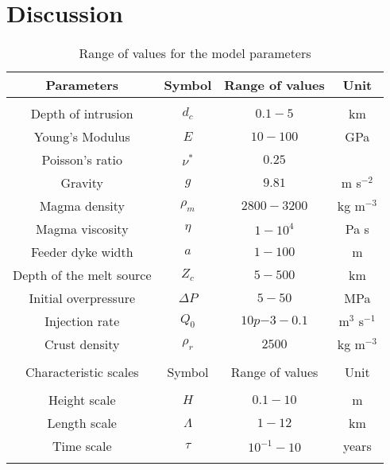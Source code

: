 \section{Discussion}
\label{C2-sec:discussion}


\begin{table}
  \caption{Range of values for the model parameters}
  \centering
  \begin{tabular}{c|c|c|c}
    \hline
    Parameters& Symbol & Range of values &Unit\\
    \hline
              &&\\
    Depth of intrusion & $d_c$ & $0.1-5$ &km \\
    Young's Modulus & $E$ & $10-100$ &GPa \\
    Poisson's ratio & $\nu^*$ & $0.25$ &\\
    Gravity & $g$ & $9.81$ &m s$^{-2}$ \\
    Magma density & $\rho_{m}$ & $2800-3200$ &kg m$^{-3}$ \\
    Magma viscosity & $\eta $ & $1-10^{4}$ &Pa s \\
    Feeder dyke width & $a$ & $1-100$ &m \\
    Depth of the melt source & $Z_{c}$ & $ 5-500$& km \\ 
    Initial overpressure & $\Delta P$ & $5-50$ &MPa \\
    Injection rate & $Q_{0}$ &$10p{-3}-0.1$ &m$^{3}$ s$^{-1}$ \\
    Crust density & $\rho_{r}$ & $2500$ &kg m$^{-3}$ \\
              &&\\
    \hline
    Characteristic scales & Symbol & Range of values & Unit\\
    \hline
              &&\\
    Height scale & $H$& $0.1-10$ &m \\
    Length scale & $\Lambda$ & $1-12$& km \\
    Time scale & $\tau$ & $10^{-1}-10$ &years \\
    \label{tab2}
  \end{tabular} 
\end{table}
